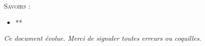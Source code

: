 \documentclass[11pt,oneside]{article}
\begin{document}
\vspace{.5cm}








\begin{savoir}
\textsc{Savoirs :}
\begin{itemize}
\item **
\end{itemize}
\end{savoir}
 

\setlength{\parskip}{0ex plus 0.2ex minus 0ex}
 \renewcommand{\contentsname}{}
 \renewcommand{\baselinestretch}{1}

\tableofcontents

 \renewcommand{\baselinestretch}{1.2}
\setlength{\parskip}{2ex plus 0.5ex minus 0.2ex}

\textit{Ce document évolue. Merci de signaler toutes erreurs ou coquilles.}
\end{document}
